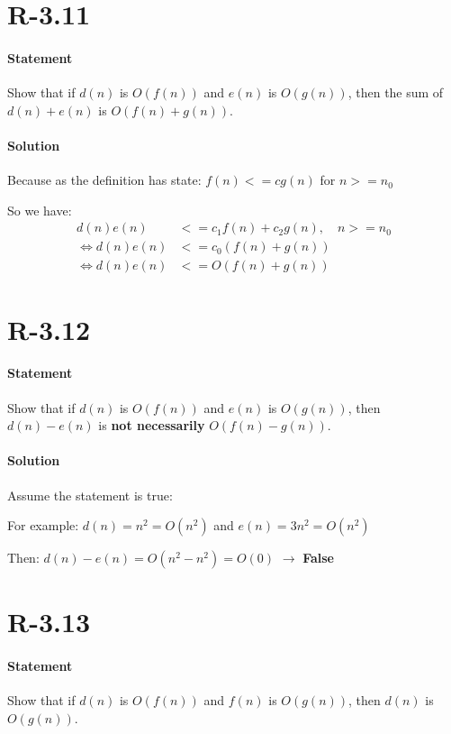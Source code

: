 \documentclass{article}
\begin{document}
\setlength{\parindent}{12ex}

\section{R-3.11}
\paragraph{Statement}
Show that if $d(n)$ is $O(f(n))$ and $e(n)$ is $O(g(n))$, then the sum of $d(n)+e(n)$
is $O(f(n)+g(n))$.
\paragraph{Solution}
  Because as the definition has state: $f(n) <= cg(n)$ for $n>=n_{0}$
  \par So we have: 
  \begin{align*}
    d(n)e(n) &<= c_{1}f(n) + c_{2}g(n), \quad n>=n_{0}\\
    \Leftrightarrow d(n)e(n) &<= c_{0}(f(n) + g(n))\\
    \Leftrightarrow d(n)e(n) &<= O(f(n) + g(n))
  \end{align*}
\section{R-3.12}
\paragraph{Statement}
Show that if $d(n)$ is $O(f(n))$ and $e(n)$ is $O(g(n))$, then $d(n) - e(n)$
is \textbf{not necessarily} $O(f(n)-g(n))$.
\paragraph{Solution}
  Assume the statement is true:\par
  For example: $d(n) = n^2 = O(n^2)$ and $e(n) = 3n^2 = O(n^2)$\par
  Then: $d(n)-e(n) = O(n^2-n^2) = O(0)$
  $\rightarrow$ \textbf{False}
\section{R-3.13}
\paragraph{Statement}
Show that if $d(n)$ is $O(f(n))$ and $f(n)$ is $O(g(n))$, then $d(n)$
is $O(g(n))$.
\end{document}
